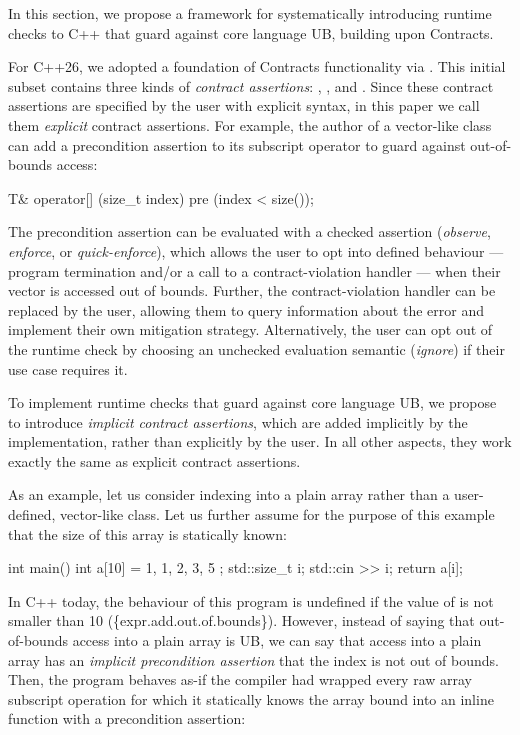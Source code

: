 In this section, we propose a framework for systematically introducing runtime checks to C++ that guard against core language UB, building upon Contracts.

For C++26, we adopted a foundation of Contracts functionality via \cite{P2900R14}. This initial subset contains three kinds of \emph{contract assertions}: , , and . Since these contract assertions are specified by the user with explicit syntax, in this paper we call them \emph{explicit} contract assertions. For example, the author of a vector-like class can add a precondition assertion to its subscript operator to guard against out-of-bounds access:

\begin{codeblock}
T& operator[] (size_t index)
  pre (index < size());
\end{codeblock}

The precondition assertion  can be evaluated with a checked assertion  (\emph{observe}, \emph{enforce}, or \emph{quick-enforce}), which allows the user to opt into defined behaviour --- program termination and/or a call to a contract-violation handler --- when their vector is accessed out of bounds. Further, the contract-violation handler can be replaced by the user, allowing them to query information about the error and implement their own mitigation strategy. Alternatively, the user can opt out of the runtime check by choosing an unchecked evaluation semantic (\emph{ignore}) if their use case requires it.

To implement runtime checks that guard against core language UB, we propose to introduce \emph{implicit contract assertions}, which are added implicitly by the implementation, rather than explicitly by the user. In all other aspects, they work exactly the same as explicit contract assertions.

As an example, let us consider indexing into a plain array rather than a user-defined, vector-like class. Let us further assume for the purpose of this example that the size  of this array is statically known:

\begin{codeblock}
int main() {
  int a[10] = { 1, 1, 2, 3, 5 };
  std::size_t i; 
  std::cin >> i;
  return a[i];
}
\end{codeblock}

In C++ today, the behaviour of this program is undefined if the value of  is not smaller than 10 (\{expr.add.out.of.bounds\}). However, instead of saying that out-of-bounds access into a plain array is UB, we can say that access into a plain array has an \emph{implicit precondition assertion} that the index is not out of bounds. Then, the program behaves as-if the compiler had wrapped every raw array subscript operation for which it statically knows the array bound  into an inline function with a precondition assertion:

